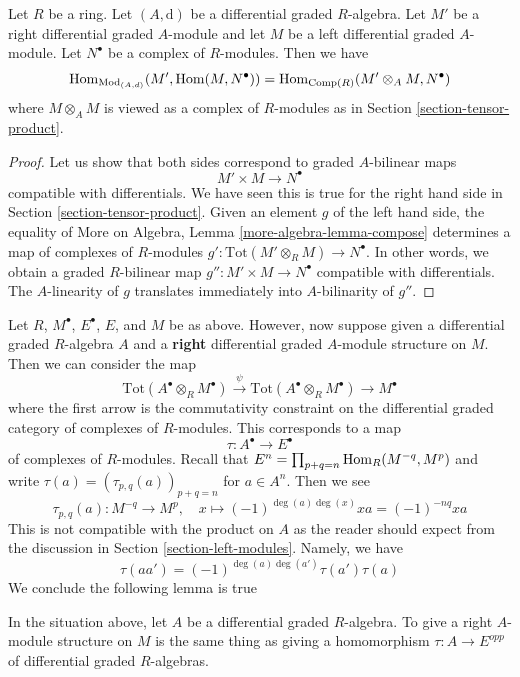 \begin{lemma}
\label{lemma-characterize-hom}
Let $R$ be a ring. Let $(A, \text{d})$ be a differential graded $R$-algebra.
Let $M'$ be a right differential graded $A$-module and let
$M$ be a left differential graded $A$-module.
Let $N^\bullet$ be a complex of $R$-modules. Then we have
$$
\mathop{\mathrm{Hom}}\nolimits_{\text{Mod}_{(A, d)}}(M', \mathop{\mathrm{Hom}}\nolimits(M, N^\bullet)) =
\mathop{\mathrm{Hom}}\nolimits_{\text{Comp}(R)}(M' \otimes_A M, N^\bullet)
$$
where $M \otimes_A M$ is viewed as a complex of $R$-modules
as in Section \ref{section-tensor-product}.
\end{lemma}

\begin{proof}
Let us show that both sides correspond to graded $A$-bilinear maps
$$
M' \times M \longrightarrow N^\bullet
$$
compatible with differentials. We have seen this is true for the right
hand side in Section \ref{section-tensor-product}. Given an element
$g$ of the left hand side, the equality of
More on Algebra, Lemma \ref{more-algebra-lemma-compose}
determines a map of complexes of $R$-modules
$g' : \text{Tot}(M' \otimes_R M) \to N^\bullet$.
In other words, we obtain a graded $R$-bilinear
map $g'' : M' \times M \to N^\bullet$ compatible with differentials.
The $A$-linearity of $g$ translates immediately
into $A$-bilinarity of $g''$.
\end{proof}

\noindent
Let $R$, $M^\bullet$, $E^\bullet$, $E$, and $M$ be as above.
However, now suppose given a differential graded $R$-algebra $A$
and a {\bf right} differential graded $A$-module structure on $M$.
Then we can consider the map
$$
\text{Tot}(A^\bullet \otimes_R M^\bullet)
\xrightarrow{\psi}
\text{Tot}(A^\bullet \otimes_R M^\bullet)
\to
M^\bullet
$$
where the first arrow is the commutativity constraint on the
differential graded category of complexes of $R$-modules.
This corresponds to a map
$$
\tau : A^\bullet \longrightarrow E^\bullet
$$
of complexes of $R$-modules. Recall that
$E^n = \prod_{p + q = n} \mathop{\mathrm{Hom}}\nolimits_R(M^{-q}, M^p)$
and write $\tau(a) = (\tau_{p, q}(a))_{p + q = n}$ for $a \in A^n$.
Then we see
$$
\tau_{p, q}(a) : M^{-q} \longrightarrow M^p,\quad
x \longmapsto (-1)^{\deg(a)\deg(x)}x a = (-1)^{-nq}xa
$$
This is not compatible with the product on $A$ as the reader should
expect from the discussion in Section \ref{section-left-modules}.
Namely, we have
$$
\tau(a a') = (-1)^{\deg(a)\deg(a')}\tau(a') \tau(a)
$$
We conclude the following lemma is true

\begin{lemma}
\label{lemma-right-module-structure}
In the situation above, let $A$ be a differential graded $R$-algebra.
To give a right $A$-module structure on $M$ is the same thing as
giving a homomorphism $\tau : A \to E^{opp}$
of differential graded $R$-algebras.
\end{lemma}

